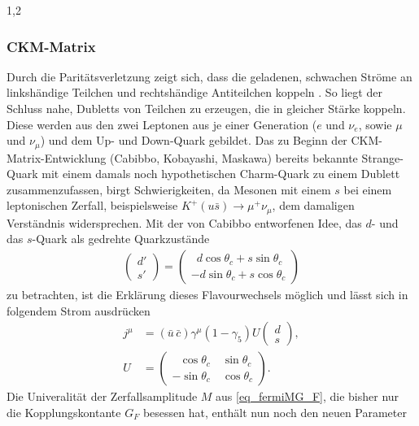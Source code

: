 \documentclass[11pt,a4paper,twoside]{report}
\begin{document}
\begin{spacing}{1,2}
\subsubsection{CKM-Matrix}
\label{sec_CKM}
Durch die Paritätsverletzung zeigt sich, dass die geladenen, schwachen Ströme an linkshändige Teilchen und rechtshändige Antiteilchen koppeln \cite{DissForm}\cite{Sibold}. 
So liegt der Schluss nahe, Dubletts von Teilchen zu erzeugen, die in gleicher Stärke koppeln. Diese werden aus den zwei Leptonen aus je einer Generation 
($e$ und $\nu_e$, sowie $\mu$ und $\nu_\mu$) und dem Up- und Down-Quark gebildet. Das zu Beginn der CKM-Matrix-Entwicklung (Cabibbo, Kobayashi, Maskawa) 
bereits bekannte Strange-Quark
mit einem damals noch hypothetischen Charm-Quark zu einem Dublett zusammenzufassen, birgt Schwierigkeiten, da Mesonen mit einem $s$ bei einem leptonischen
Zerfall, beispielsweise $K^+(u\bar s) \rightarrow \mu^+ \nu_\mu$, dem damaligen Verständnis widersprechen. Mit der von Cabibbo entworfenen Idee, das $d$-
und das $s$-Quark als gedrehte Quarkzustände 
\begin{align}
 \begin{pmatrix}
  d'\\
  s'
 \end{pmatrix} = \begin{pmatrix}
		  \,\,\,d \cos \theta_c + s \sin \theta_c\\
		  -d \sin \theta_c + s\cos \theta_c
		  \end{pmatrix}
\end{align}
zu betrachten, ist die Erklärung dieses Flavourwechsels möglich und lässt sich in folgendem Strom ausdrücken
\begin{align}
 j^\mu &= (\bar u\, \bar c) \gamma^\mu (1-\gamma_5) U \begin{pmatrix}
                                                      d\\
                                                      s
                                                     \end{pmatrix},\\
 U &= \begin{pmatrix}
      \,\,\,\,\cos \theta_c\quad \sin \theta_c\\
      -\sin \theta_c\quad \cos \theta_c
     \end{pmatrix}.
\end{align}
Die Univeralität der Zerfallsamplitude $M$ aus \eqref{eq_fermiMG_F}, die bisher nur die Kopplungskontante $G_F$ besessen hat, enthält nun noch den neuen Parameter

\end{spacing}
\end{document}
